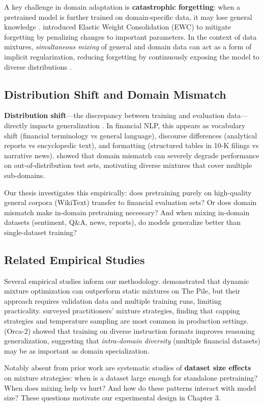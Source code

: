 A key challenge in domain adaptation is \textbf{catastrophic forgetting}: when a pretrained model is further trained on domain-specific data, it may lose general knowledge \parencite{mccloskey1989catastrophic, french1999catastrophic}. \textcite{kirkpatrick2017overcoming} introduced Elastic Weight Consolidation (EWC) to mitigate forgetting by penalizing changes to important parameters. In the context of data mixtures, \textit{simultaneous mixing} of general and domain data can act as a form of implicit regularization, reducing forgetting by continuously exposing the model to diverse distributions \parencite{arivazhagan2019massively,raffel2020exploring}.

\subsection{Distribution Shift and Domain Mismatch}

\textbf{Distribution shift}—the discrepancy between training and evaluation data—directly impacts generalization \parencite{quinonero2009dataset}. In financial NLP, this appears as vocabulary shift (financial terminology vs general language), discourse differences (analytical reports vs encyclopedic text), and formatting (structured tables in 10-K filings vs narrative news). \textcite{aharoni2020unsupervised} showed that domain mismatch can severely degrade performance on out-of-distribution test sets, motivating diverse mixtures that cover multiple sub-domains.

Our thesis investigates this empirically: does pretraining purely on high-quality general corpora (WikiText) transfer to financial evaluation sets? Or does domain mismatch make in-domain pretraining necessary? And when mixing in-domain datasets (sentiment, Q\&A, news, reports), do models generalize better than single-dataset training?

\subsection{Related Empirical Studies}

Several empirical studies inform our methodology. \textcite{xie2023doremi} demonstrated that dynamic mixture optimization can outperform static mixtures on The Pile, but their approach requires validation data and multiple training runs, limiting practicality. \textcite{longpre2023pretrainer} surveyed practitioners' mixture strategies, finding that capping strategies and temperature sampling are most common in production settings. \textcite{mitra2023orca2} (Orca-2) showed that training on diverse instruction formats improves reasoning generalization, suggesting that \textit{intra-domain diversity} (multiple financial datasets) may be as important as domain specialization.

Notably absent from prior work are systematic studies of \textbf{dataset size effects} on mixture strategies: when is a dataset large enough for standalone pretraining? When does mixing help vs hurt? And how do these patterns interact with model size? These questions motivate our experimental design in Chapter 3.
